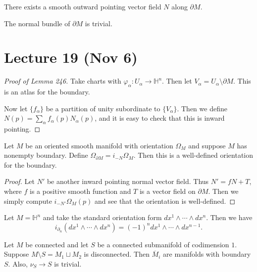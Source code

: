 \documentclass[twoside, 10pt]{article}
\renewcommand{\H}{\mathbb{H}}
\begin{document}
    \begin{lem} There exists a smooth outward pointing vector field $N$ along
    $\partial M$.  \end{lem}

    \begin{cor} The normal bundle of $\partial M$ is trivial.  \end{cor}

    \section{Lecture 19 (Nov 6)}%
    
    \begin{proof}[Proof of Lemma 246] Take charts with $\varphi_{\alpha}:
        U_{\alpha} \to \H^n$. Then let $V_{\alpha} = U_{\alpha} \setminus
        \partial M$. This is an atlas for the boundary.

        Now let $\{f_{\alpha} \} $ be a partition of unity subordinate to
    $\{V_{\alpha}\}$. Then we define $N(p) = \sum_{\alpha} f_{\alpha}(p)
N_{\alpha}(p)$, and it is easy to check that this is inward pointing.
\end{proof}

    \begin{prop} Let $M$ be an oriented smooth manifold with orientation
    $\Omega_M$ and suppose $M$ has nonempty boundary. Define $\Omega_{\partial
M} = i_{-N}\Omega_M$. Then this is a well-defined orientation for the boundary.
\end{prop}

    \begin{proof} Let $N'$ be another inward pointing normal vector field. Thus
        $N' = fN + T$, where $f$ is a positive smooth function and $T$ is a
        vector field on $\partial M$. Then we simply compute
        $i_{-N'}\Omega_M(p)$ and see that the orientation is well-defined.
    \end{proof}

    \begin{exm} Let $M = \H^n$ and take the standard orientation form $dx^1
        \wedge \cdots \wedge dx^n$. Then we have \[ i_{\partial_n}(dx^1 \wedge
        \cdots \wedge dx^n) = (-1)^n dx^1 \wedge \cdots \wedge dx^{n-1}.\]
    \end{exm}

    \begin{lem} Let $M$ be connected and let $S$ be a connected submanifold of
        codimension $1$. Suppose $M \setminus S = M_1 \sqcup M_2$ is
        disconnected. Then $\overline{M}_i$ are manifolds with boundary $S$.
        Also, $\nu_S \to S$ is trivial.  \end{lem}
\end{document}
